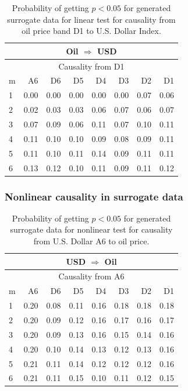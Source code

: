 %
%
\begin{table}[H]
\begin{center}
\begin{tabular}{l|r r r r r r r}
\hline\hline
\multicolumn{8}{c}{Oil $\Rightarrow$ USD}\\
\hline
\multicolumn{8}{c}{Causality from D1}\\
\hline\hline
m & A6 & D6 & D5 & D4 & D3 & D2 & D1 \\
\hline
1 & 0.00 & 0.00 & 0.00 & 0.00 & 0.00 & 0.07 & 0.06 \\
2 & 0.02 & 0.03 & 0.03 & 0.06 & 0.07 & 0.06 & 0.07 \\
3 & 0.07 & 0.09 & 0.06 & 0.11 & 0.07 & 0.10 & 0.11 \\
4 & 0.11 & 0.10 & 0.10 & 0.09 & 0.08 & 0.09 & 0.11 \\
5 & 0.11 & 0.10 & 0.11 & 0.14 & 0.09 & 0.11 & 0.11 \\
6 & 0.13 & 0.12 & 0.10 & 0.11 & 0.09 & 0.11 & 0.12 \\
\hline\hline
\end{tabular}
\caption{Probability of getting $p < 0.05$ for generated surrogate data for linear test for causality from oil price band D1 to U.S. Dollar Index.}
\end{center}
\end{table}

\subsubsection{Nonlinear causality in surrogate data}
%
%
\begin{table}[H]
\begin{center}
\begin{tabular}{l|r r r r r r r}
\hline\hline
\multicolumn{8}{c}{USD $\Rightarrow$ Oil}\\
\hline
\multicolumn{8}{c}{Causality from A6}\\
\hline\hline
m & A6 & D6 & D5 & D4 & D3 & D2 & D1 \\
\hline
1 & 0.20 & 0.08 & 0.11 & 0.16 & 0.18 & 0.18 & 0.18 \\
2 & 0.20 & 0.09 & 0.12 & 0.16 & 0.17 & 0.16 & 0.17 \\
3 & 0.20 & 0.09 & 0.13 & 0.16 & 0.15 & 0.14 & 0.16 \\
4 & 0.20 & 0.10 & 0.14 & 0.13 & 0.12 & 0.13 & 0.16 \\
5 & 0.21 & 0.11 & 0.14 & 0.12 & 0.12 & 0.12 & 0.16 \\
6 & 0.21 & 0.11 & 0.15 & 0.10 & 0.11 & 0.12 & 0.15 \\
\hline\hline
\end{tabular}
\caption{Probability of getting $p < 0.05$ for generated surrogate data for nonlinear test for causality from U.S. Dollar A6 to oil price.}
\end{center}
\end{table}

